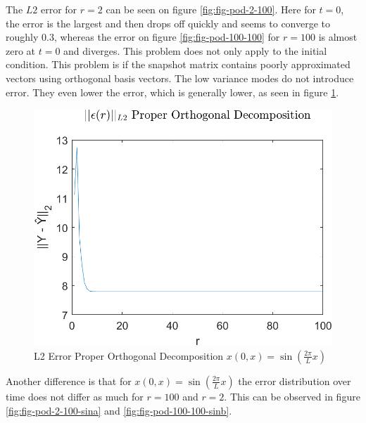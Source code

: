 The \(L2\) error for \(r=2\) can be seen on figure \ref{fig:fig-pod-2-100}.
Here for \(t=0\), the error is the largest and then drops off quickly and seems to converge to roughly 0.3, whereas the error on figure \ref{fig:fig-pod-100-100} for \(r=100\) is almost zero at \(t=0\) and diverges.
This problem does not only apply to the initial condition. This problem is if the snapshot matrix contains poorly approximated vectors using orthogonal basis vectors.
The low variance modes do not introduce error. 
They even lower the error, which is generally lower, as seen in figure \ref{FIG-ERR-POD-SIN}.
\begin{figure}[H]
\centering
\includegraphics[width=12.5cm]{images/L2_POD_SIN}
\caption{L2 Error Proper Orthogonal Decomposition $x(0, x) = \sin(\frac{2\pi}{L}x)$}
\label{FIG-ERR-POD-SIN}
\end{figure}
Another difference is that for $x(0, x) = \sin(\frac{2\pi}{L}x)$ the error distribution over time does not differ as much for \(r=100\) and \(r=2\).
This can be observed in figure \ref{fig:fig-pod-2-100-sina} and \ref{fig:fig-pod-100-100-sinb}.
